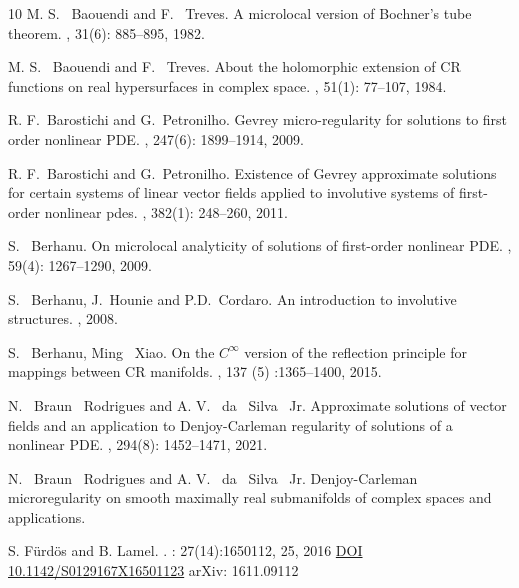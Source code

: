 \documentclass[11pt]{amsart}
\theoremstyle{definition}
\theoremstyle{remark}
\theoremstyle{plain}
\begin{document}
\begin{thebibliography}{10}
M. S. ~Baouendi  and F. ~Treves.
\newblock A microlocal version of {B}ochner's tube theorem.
, 31(6): 885--895, 1982.

M. S. ~Baouendi  and F. ~Treves.
\newblock About the holomorphic extension of CR functions on real hypersurfaces in complex space.
, 51(1): 77--107, 1984.

R. F.~Barostichi and G.~Petronilho.
\newblock Gevrey micro-regularity for solutions to first order nonlinear PDE.
, 247(6): 1899--1914, 2009.

R. F.~Barostichi and G.~Petronilho.
\newblock Existence of Gevrey approximate solutions for certain systems of linear vector fields applied to involutive systems of first-order nonlinear pdes.
, 382(1): 248--260, 2011.

S. ~Berhanu.
\newblock On microlocal analyticity of solutions of first-order nonlinear PDE.
, 59(4): 1267--1290, 2009.

S. ~Berhanu, J.~Hounie and P.D.~Cordaro.
\newblock An introduction to involutive structures.
, 2008.

S. ~Berhanu, Ming ~Xiao.
\newblock On the $C^\infty$ version of the reflection principle for mappings between CR manifolds.
, 137 (5) :1365--1400, 2015.

N. ~Braun ~Rodrigues and A. V. ~da ~Silva ~Jr.
\newblock Approximate solutions of vector fields and an application to Denjoy-Carleman regularity of solutions of a nonlinear PDE.
, 294(8): 1452--1471, 2021.

N. ~Braun ~Rodrigues and A. V. ~da ~Silva ~Jr.
\newblock Denjoy-Carleman microregularity on smooth maximally real submanifolds of complex spaces and applications.

 S. Fürdös and B. Lamel.
.
: 27(14):1650112, 25, 2016
\href{https://doi.org/10.1142/S0129167X16501123}{DOI 10.1142/S0129167X16501123}
{arXiv: 1611.09112}



\end{thebibliography}
\end{document}
